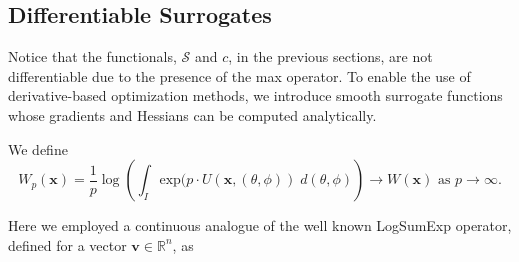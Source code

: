\documentclass[11pt,letterpaper]{article}
\theoremstyle{definition}
\theoremstyle{plain}
\newtheorem{corollary}[theorem]{Corollary}
\begin{document}








\subsection{Differentiable Surrogates}

Notice that the functionals, $\mathcal{S}$ and $c$, in the previous sections, are not differentiable due to the presence of the max operator. To enable the use of derivative-based optimization methods, we introduce smooth surrogate functions whose gradients and Hessians can be computed analytically.

We define
\begin{equation}
W_p(\mathbf{x}) = \frac{1}{p} \log\left( \int_I \text{exp}(p\cdot U(\mathbf{x}, (\theta, \phi)) \; d(\theta,\phi) \right) \to W(\mathbf{x}) \text{ as } p \to \infty.
\end{equation}

Here we employed a continuous analogue of the well known LogSumExp operator, defined for a vector $\mathbf{v} \in \mathbb{R}^n$, as
\end{document}

